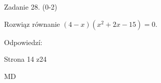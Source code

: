 \documentclass[a4paper,12pt]{article}
\begin{document}
Zadanie 28. (0-2)

Rozwiąz równanie $(4-x)(x^{2}+2x-15)=0.$

Odpowiedzí:

Strona 14 z24

MD
\end{document}
